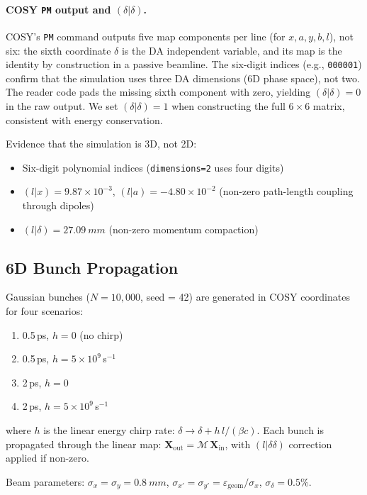 \documentclass[11pt]{article}
\begin{document}
\paragraph{COSY \texttt{PM} output and $(\delta|\delta)$.}
COSY's \texttt{PM} command outputs five map components per line
(for $x, a, y, b, l$), not six: the sixth coordinate
$\delta$ is the DA independent variable, and its map is the identity by
construction in a passive beamline.  The six-digit indices (e.g.,
\texttt{000001}) confirm that the simulation uses three DA dimensions
(6D phase space), not two.  The reader code pads the missing sixth
component with zero, yielding $(\delta|\delta) = 0$ in the raw output.  We
set $(\delta|\delta) = 1$ when constructing the full $6\times6$ matrix,
consistent with energy conservation.

Evidence that the simulation is 3D, not 2D:
\begin{itemize}
  \item Six-digit polynomial indices (\texttt{dimensions=2} uses four digits)
  \item $(l|x) = 9.87\times10^{-3}$, $(l|a) = -4.80\times10^{-2}$ (non-zero
        path-length coupling through dipoles)
  \item $(l|\delta) = \SI{27.09}{mm}$ (non-zero momentum compaction)
\end{itemize}

\subsection{6D Bunch Propagation}

Gaussian bunches ($N = 10{,}000$, seed = 42) are generated in COSY
coordinates for four scenarios:
\begin{enumerate}
  \item 0.5\,ps, $h = 0$ (no chirp)
  \item 0.5\,ps, $h = 5\times10^9$\,s$^{-1}$
  \item 2\,ps, $h = 0$
  \item 2\,ps, $h = 5\times10^9$\,s$^{-1}$
\end{enumerate}
where $h$ is the linear energy chirp rate: $\delta \to \delta + h\,l/(\beta c)$.
Each bunch is propagated through the linear map:
$\mathbf{X}_\text{out} = \mathcal{M}\,\mathbf{X}_\text{in}$, with $(l|\delta\delta)$
correction applied if non-zero.

Beam parameters: $\sigma_x = \sigma_y = \SI{0.8}{mm}$,
$\sigma_{x'} = \sigma_{y'} = \varepsilon_\text{geom}/\sigma_x$,
$\sigma_\delta = 0.5\%$.
\end{document}
